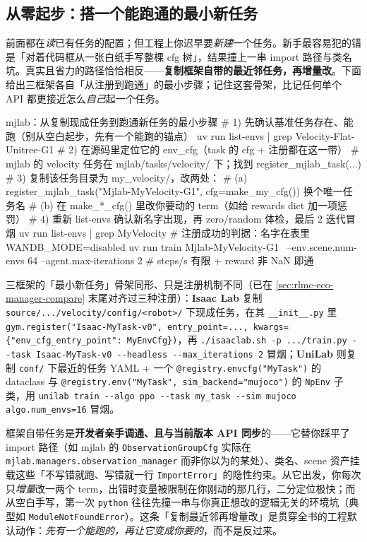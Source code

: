 \subsection{从零起步：搭一个能跑通的最小新任务}
\label{sec:rlmc-eco-fromscratch}

前面都在\emph{读}已有任务的配置；但工程上你迟早要\emph{新建}一个任务。新手最容易犯的错是「对着代码框从一张白纸手写整棵 cfg 树」，结果撞上一串 import 路径与类名坑。真实且省力的路径恰恰相反——\textbf{复制框架自带的最近邻任务，再增量改}。下面给出三框架各自「从注册到跑通」的最小步骤；记住这套骨架，比记任何单个 API 都更接近怎么\emph{自己}起一个任务。

\begin{codebox}[bash]{mjlab：从复制现成任务到跑通新任务的最小步骤}
# 1) 先确认基准任务存在、能跑（别从空白起步，先有一个能跑的锚点）
uv run list-envs | grep Velocity-Flat-Unitree-G1
# 2) 在源码里定位它的 env_cfg（task 的 cfg + 注册都在这一带）
#    mjlab 的 velocity 任务在 mjlab/tasks/velocity/ 下；找到 register_mjlab_task(...)
# 3) 复制该任务目录为 my_velocity/，改两处：
#    (a) register_mjlab_task("Mjlab-MyVelocity-G1", cfg=make_my_cfg()) 换个唯一任务名
#    (b) 在 make_*_cfg() 里改你要动的 term（如给 rewards dict 加一项惩罚）
# 4) 重新 list-envs 确认新名字出现，再 zero/random 体检，最后 2 迭代冒烟
uv run list-envs | grep MyVelocity                 # 注册成功的判据：名字在表里
WANDB_MODE=disabled uv run train Mjlab-MyVelocity-G1 \
    --env.scene.num-envs 64 --agent.max-iterations 2   # steps/s 有限 + reward 非 NaN 即通
\end{codebox}

三框架的「最小新任务」骨架同形、只是注册机制不同（已在 \cref{sec:rlmc-eco-manager-compare} 末尾对齐过三种注册）：\textbf{Isaac Lab} 复制 \verb|source/.../velocity/config/<robot>/| 下现成任务，在其 \verb|__init__.py| 里 \verb|gym.register("Isaac-MyTask-v0", entry_point=..., kwargs={"env_cfg_entry_point": MyEnvCfg})|，再 \verb|./isaaclab.sh -p .../train.py --task Isaac-MyTask-v0 --headless --max_iterations 2| 冒烟；\textbf{UniLab} 则复制 \verb|conf/| 下最近的任务 YAML + 一个 \verb|@registry.envcfg("MyTask")| 的 dataclass 与 \verb|@registry.env("MyTask", sim_backend="mujoco")| 的 \verb|NpEnv| 子类，用 \verb|unilab train --algo ppo --task my_task --sim mujoco algo.num_envs=16| 冒烟。

\begin{insight}\label{ins:rlmc-eco-copyfrom}
框架自带任务是\textbf{开发者亲手调通、且与当前版本 API 同步}的——它替你踩平了 import 路径（如 mjlab 的 \verb|ObservationGroupCfg| 实际在 \verb|mjlab.managers.observation_manager| 而非你以为的某处）、类名、scene 资产挂载这些「不写错就跑、写错就一行 \verb|ImportError|」的隐性约束。从它出发，你每次只\emph{增量}改一两个 term，出错时变量被限制在你刚动的那几行，二分定位极快；而从空白手写，第一次 \verb|python| 往往先撞一串与你真正想改的逻辑无关的环境坑（典型如 \verb|ModuleNotFoundError|）。这条「复制最近邻再增量改」是贯穿全书的工程默认动作：\emph{先有一个能跑的，再让它变成你要的}，而不是反过来。
\end{insight}

